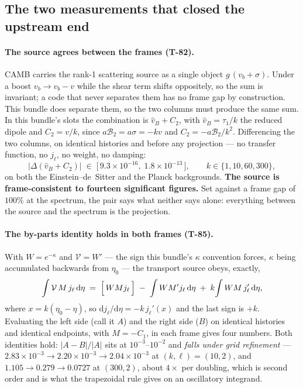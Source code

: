 \subsection{The two measurements that closed the upstream end}

\paragraph{The source agrees between the frames (T-82).}
CAMB carries the rank-1 scattering source as a single object $g\,(v_b+\sigma)$.
Under a boost $v_b\to v_b-v$ while the shear term shifts oppositely, so the sum
is invariant; a code that never separates them has no frame gap by
construction. This bundle does separate them, so the two columns must produce
the same sum. In this bundle's slots the combination is
$\hat v_B + C_2$, with $\hat v_B=\tau_1/k$ the reduced dipole and $C_2 = v/k$,
since $a\mathcal B_2 = a\sigma = -k v$ and $C_2 = -a\mathcal B_2/k^2$.
Differencing the two columns, on identical histories and before any
projection --- no transfer function, no $j_\ell$, no weight, no damping:
\begin{equation}
  \bigl\lvert\Delta(\hat v_B + C_2)\bigr\rvert
  \;\in\;\bigl[\,9.3\times10^{-16},\;1.8\times10^{-13}\,\bigr],
  \qquad k\in\{1,10,60,300\},
\end{equation}
on both the Einstein--de~Sitter and the Planck backgrounds. \textbf{The source
is frame-consistent to fourteen significant figures.} Set against a frame gap
of $100\%$ at the spectrum, the pair says what neither says alone: everything
between the source and the spectrum is the projection.

\paragraph{The by-parts identity holds in both frames (T-85).}
With $W=e^{-\kappa}$ and $\mathcal V = W'$ --- the sign this bundle's
$\kappa$ convention forces, $\kappa$ being accumulated backwards from
$\eta_0$ --- the transport source obeys, exactly,
\begin{equation}
  \int \mathcal V\,M\,j_\ell\,\mathrm d\eta
  \;=\;\Bigl[\,W M j_\ell\,\Bigr]
  \;-\;\int W M' j_\ell\,\mathrm d\eta
  \;+\;k\!\int W M\,j_\ell'\,\mathrm d\eta ,
  \label{eq:byparts-identity}
\end{equation}
where $x = k(\eta_0-\eta)$, so $\mathrm dj_\ell/\mathrm d\eta = -k\,j_\ell'(x)$
and the last sign is $+k$. Evaluating the left side (call it $A$) and the right
side ($B$) on identical histories and identical endpoints, with $M=-C_1$, in
each frame gives four numbers. Both identities hold: $\lvert A-B\rvert/\lvert
A\rvert$ sits at $10^{-3}$--$10^{-2}$ and \emph{falls under grid refinement}
--- $2.83\times10^{-3}\to2.20\times10^{-3}\to2.04\times10^{-3}$ at $(k,\ell)=(10,2)$,
and $1.105\to0.279\to0.0727$ at $(300,2)$, about $4\times$ per doubling, which
is second order and is what the trapezoidal rule gives on an oscillatory
integrand.

